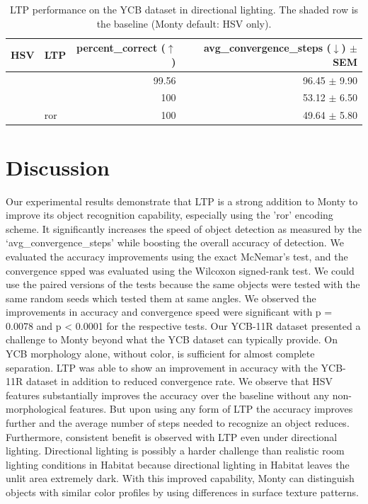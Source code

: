 \documentclass[runningheads]{llncs}
\newcommand{\tickm}{\ding{52}}
\newcommand{\cross}{\ding{56}}
\newcommand{\baserow}{\rowcolor{black!10}}
\begin{document}
\begin{table}
    \setlength{\tabcolsep}{4pt}
    \vspace{-.5cm}
    \renewcommand{\arraystretch}{1.25}
    \vspace{.1cm}
    \centering
    \begin{tabular}{l|l|r|r}
    \hline
    \textbf{HSV} & \textbf{LTP} & \textbf{percent\_correct ($\uparrow$)} & \textbf{avg\_convergence\_steps ($\downarrow$) $\pm$ SEM} \\
    \hline \hline
             \cross & \cross & 99.56 & 96.45 $\pm$ 9.90 \\\hline
    \baserow \tickm & \cross & 100   & 53.12 $\pm$ 6.50 \\\hline
             \tickm & ror    & 100   & 49.64 $\pm$ 5.80 \\\hline
    \end{tabular}
    \vspace{.1cm}
    \caption{LTP performance on the YCB dataset in directional lighting. The shaded row is the baseline (Monty default: HSV only).}
    \label{tab:77obj}
\end{table}
\vspace{-1.5cm}
\section{Discussion}

Our experimental results demonstrate that LTP is a strong addition to Monty to improve its object recognition capability, especially using the 'ror' encoding scheme. It significantly increases the speed of object detection as measured by the `avg\_convergence\_steps' while boosting the overall accuracy of detection. We evaluated the accuracy improvements using the exact McNemar's test, and the convergence spped was evaluated using the Wilcoxon signed-rank test. We could use the paired versions of the tests because the same objects were tested with the same random seeds which tested them at same angles. We observed the improvements in accuracy and convergence speed were significant with p = 0.0078 and p < 0.0001 for the respective tests. Our YCB-11R dataset presented a challenge to Monty beyond what the YCB dataset can typically provide. On YCB morphology alone, without color, is sufficient for almost complete separation. LTP was able to show an improvement in accuracy with the YCB-11R dataset in addition to reduced convergence rate. We observe that HSV features substantially improves the accuracy over the baseline without any non-morphological features. But upon using any form of LTP the accuracy improves further and the average number of steps needed to recognize an object reduces. Furthermore, consistent benefit is observed with LTP even under directional lighting. Directional lighting is possibly a harder challenge than realistic room lighting conditions in Habitat because directional lighting in Habitat leaves the unlit area extremely dark. With this improved capability, Monty can distinguish objects with similar color profiles by using differences in surface texture patterns.  
\end{document}

